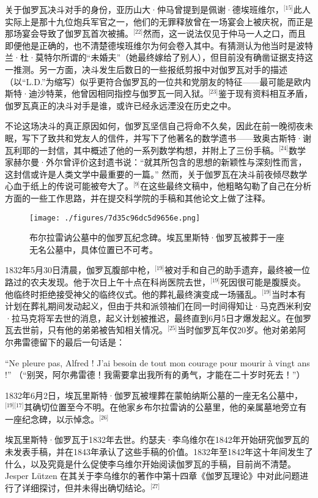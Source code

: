 关于伽罗瓦决斗对手的身份，亚历山大·仲马曾提到是佩谢·德埃班维尔，\(^\text{[15]}\)此人实际上是那十九位炮兵军官之一，他们的无罪释放曾在一场宴会上被庆祝，而正是那场宴会导致了伽罗瓦首次被捕。\(^\text{[22]}\)然而，这一说法仅见于仲马一人之口，而且即便他是正确的，也不清楚德埃班维尔为何会卷入其中。有猜测认为他当时是波特兰·杜·莫特尔所谓的“未婚夫”（她最终嫁给了别人），但目前没有确凿证据支持这一推测。另一方面，决斗发生后数日的一些报纸剪报中对伽罗瓦对手的描述（以“L.D.”为缩写）似乎更符合伽罗瓦的一位共和党朋友的特征——最可能是欧内斯特·迪沙特莱，他曾因相同指控与伽罗瓦一同入狱。\(^\text{[23]}\)鉴于现有资料相互矛盾，伽罗瓦真正的决斗对手是谁，或许已经永远湮没在历史之中。

不论这场决斗的真正原因如何，伽罗瓦坚信自己将命不久矣，因此在前一晚彻夜未眠，写下了致共和党友人的信件，并写下了他著名的数学遗书——致奥古斯特·谢瓦利耶的一封信，其中概述了他的一系列数学构想，并附上了三份手稿。\(^\text{[24]}\)数学家赫尔曼·外尔曾评价这封遗书说：“就其所包含的思想的新颖性与深刻性而言，这封信或许是人类文学中最重要的一篇。” 然而，关于伽罗瓦在决斗前夜倾尽数学心血于纸上的传说可能被夸大了。\(^\text{[9]}\)在这些最终文稿中，他粗略勾勒了自己在分析方面的一些工作思路，并在提交科学院的手稿和其他论文上做了注释。
\begin{figure}[ht]
\centering
\texttt{[image: ./figures/7d35c96dc5d9656e.png]}
\caption{布尔拉雷讷公墓中的伽罗瓦纪念碑。埃瓦里斯特·伽罗瓦被葬于一座无名公墓中，具体位置已不可考。} \label{fig_AWLS_5}
\end{figure}
1832年5月30日清晨，伽罗瓦腹部中枪，\(^\text{[19]}\)被对手和自己的助手遗弃，最终被一位路过的农夫发现。他于次日上午十点在科尚医院去世，\(^\text{[19]}\)死因很可能是腹膜炎。他临终时拒绝接受神父的临终仪式。他的葬礼最终演变成一场骚乱。\(^\text{[19]}\)当时本有计划在葬礼期间发动起义，但由于共和派领袖们在同一时间得知让·马克西米利安·拉马克将军去世的消息，起义计划被推迟，最终直到6月5日才爆发起义。在伽罗瓦去世前，只有他的弟弟被告知相关情况。\(^\text{[25]}\)当时伽罗瓦年仅20岁。他对弟弟阿尔弗雷德留下的最后一句话是：

“Ne pleure pas, Alfred ! J'ai besoin de tout mon courage pour mourir à vingt ans !”
（“别哭，阿尔弗雷德！我需要拿出我所有的勇气，才能在二十岁时死去！”）

1832年6月2日，埃瓦里斯特·伽罗瓦被埋葬在蒙帕纳斯公墓的一座无名公墓中，\(^\text{[19][17]}\)其确切位置至今不明。在他家乡布尔拉雷讷的公墓里，他的亲属墓地旁立有一座纪念碑，以示悼念。\(^\text{[26]}\)

埃瓦里斯特·伽罗瓦于1832年去世。约瑟夫·李乌维尔在1842年开始研究伽罗瓦的未发表手稿，并在1843年承认了这些手稿的价值。1832年至1842年这十年间发生了什么，以及究竟是什么促使李乌维尔开始阅读伽罗瓦的手稿，目前尚不清楚。Jesper Lützen 在其关于李乌维尔的著作中第十四章《伽罗瓦理论》中对此问题进行了详细探讨，但并未得出确切结论。\(^\text{[27]}\)

